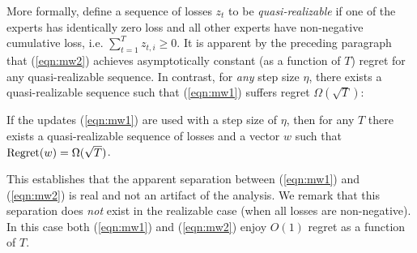 \documentclass[paper_icml.tex]{subfiles}
\begin{document}
More formally, define a sequence of losses $z_t$ to be \emph{quasi-realizable} 
if one of the experts has identically zero loss and all other experts 
have non-negative cumulative loss, i.e. $\sum_{t=1}^T z_{t,i} \geq 0$. It is 
apparent by the preceding paragraph that (\ref{eqn:mw2}) achieves asymptotically 
constant (as a function of $T$) regret for any quasi-realizable sequence. In 
contrast, for \emph{any} step size $\eta$, there exists a quasi-realizable 
sequence such that (\ref{eqn:mw1}) suffers regret $\Omega(\sqrt{T})$:
\begin{proposition}
\label{prop:separation}
If the updates (\ref{eqn:mw1}) are used with a step size of $\eta$, then for 
any $T$ there exists a quasi-realizable sequence of losses and a vector $w$ 
such that $\operatorname{Regret}(w) = \Omega(\sqrt{T})$.
\end{proposition}
This establishes that the apparent separation between (\ref{eqn:mw1}) and 
(\ref{eqn:mw2}) is real and not an artifact of the analysis. We remark that 
this separation does \emph{not} exist in the realizable case (when all losses 
are non-negative). In this case both (\ref{eqn:mw1}) and (\ref{eqn:mw2}) enjoy 
$O(1)$ regret as a function of $T$.
\end{document}
